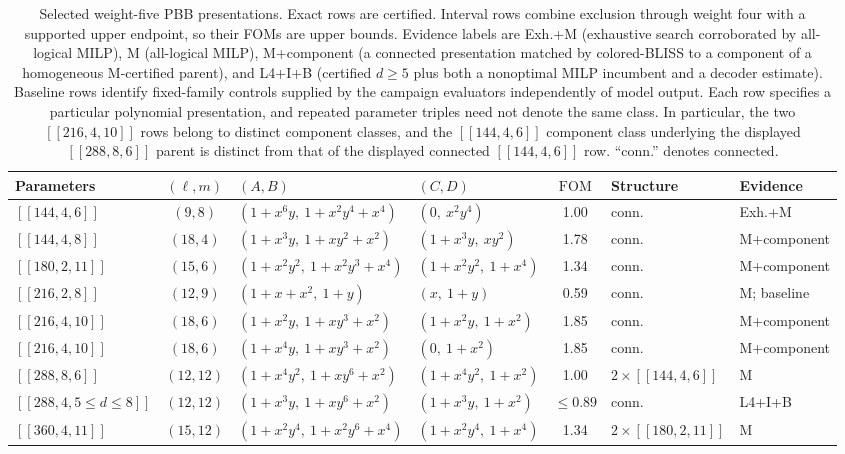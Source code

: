 \documentclass[aps,prx,twocolumn,superscriptaddress,nofootinbib,floatfix]{revtex4-2}
\newcommand{\code}[1]{\ensuremath{\left[\!\left[#1\right]\!\right]}}
\newcommand{\FOM}{\ensuremath{\mathrm{FOM}}}
\begin{document}
\begin{table}[t]
\centering
\caption{Selected weight-five PBB presentations.  Exact rows are certified.  Interval
rows combine exclusion through weight four with a supported upper endpoint, so
their FOMs are upper bounds.  Evidence labels are Exh.+M (exhaustive search
corroborated by all-logical MILP), M (all-logical MILP), M+component (a
connected presentation matched by colored-BLISS to a component of a
homogeneous M-certified parent), and L4+I+B (certified $d\geq5$ plus both a
nonoptimal MILP incumbent and a decoder estimate).
Baseline rows identify fixed-family controls supplied by the campaign
evaluators independently of model output.  Each row specifies a particular
polynomial presentation, and repeated parameter triples need not denote the
same class.  In particular, the two $\code{216,4,10}$ rows belong to distinct
component classes, and the $\code{144,4,6}$ component class underlying the
displayed $\code{288,8,6}$ parent is distinct from that of the displayed
connected $\code{144,4,6}$ row.  ``conn.'' denotes connected.}
\label{tab:pbb}
\scriptsize
\setlength{\tabcolsep}{2pt}
\begin{tabular}{lcllcll}
\toprule
Parameters & $(\ell,m)$ & $(A,B)$ & $(C,D)$ & $\FOM$ & Structure & Evidence\\
\midrule
$\code{144,4,6}$ & $(9,8)$ & $(1+x^6y,\ 1+x^2y^4+x^4)$ & $(0,\ x^2y^4)$ & 1.00 & conn. & Exh.+M\\
$\code{144,4,8}$ & $(18,4)$ & $(1+x^3y,\ 1+xy^2+x^2)$ & $(1+x^3y,\ xy^2)$ & 1.78 & conn. & M+component\\
$\code{180,2,11}$ & $(15,6)$ & $(1+x^2y^2,\ 1+x^2y^3+x^4)$ & $(1+x^2y^2,\ 1+x^4)$ & 1.34 & conn. & M+component\\
$\code{216,2,8}$ & $(12,9)$ & $(1+x+x^2,\ 1+y)$ & $(x,\ 1+y)$ & 0.59 & conn. & M; baseline\\
$\code{216,4,10}$ & $(18,6)$ & $(1+x^2y,\ 1+xy^3+x^2)$ & $(1+x^2y,\ 1+x^2)$ & 1.85 & conn. & M+component\\
$\code{216,4,10}$ & $(18,6)$ & $(1+x^4y,\ 1+xy^3+x^2)$ & $(0,\ 1+x^2)$ & 1.85 & conn. & M+component\\
$\code{288,8,6}$ & $(12,12)$ & $(1+x^4y^2,\ 1+xy^6+x^2)$ & $(1+x^4y^2,\ 1+x^2)$ & 1.00 & $2\times\code{144,4,6}$ & M\\
$\code{288,4,5{\leq}d{\leq}8}$ & $(12,12)$ & $(1+x^3y,\ 1+xy^6+x^2)$ & $(1+x^3y,\ 1+x^2)$ & $\leq0.89$ & conn. & L4+I+B\\
$\code{360,4,11}$ & $(15,12)$ & $(1+x^2y^4,\ 1+x^2y^6+x^4)$ & $(1+x^2y^4,\ 1+x^4)$ & 1.34 & $2\times\code{180,2,11}$ & M\\

\end{tabular}
\end{table}
\end{document}
